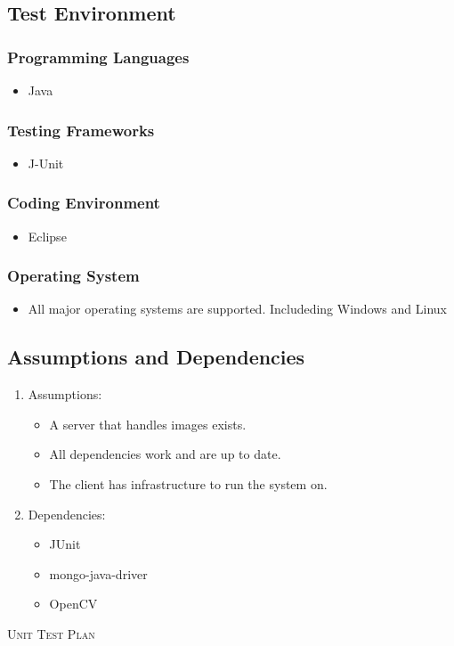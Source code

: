 \documentclass[a4paper,12pt]{report}
\begin{document}
	\subsection {Test Environment}
		\subsubsection{Programming Languages}
			\begin {itemize}
				\item Java
			\end {itemize}
		\subsubsection{Testing Frameworks}
			\begin {itemize}
				\item J-Unit
			\end {itemize}
		\subsubsection{Coding Environment}
			\begin {itemize}
				\item Eclipse
			\end {itemize}
		\subsubsection{Operating System}
			\begin {itemize}
				\item All major operating systems are supported. Includeding Windows and Linux
			\end {itemize}
	
	\newpage
	\subsection{Assumptions and Dependencies}
		\begin {enumerate}
			\item Assumptions:
			\begin {itemize}
				\item A server that handles images exists.
				\item All dependencies work and are up to date.
				\item The client has infrastructure to run the system on.
			\end {itemize}
				
			\item Dependencies:
			\begin {itemize}
				\item JUnit
				\item mongo-java-driver
				\item OpenCV
			\end {itemize}
		\end {enumerate}
\newpage
\begin{center}
	\textsc{\LARGE Unit Test Plan}\\[1.5cm]
\end{center}
\end{document}
